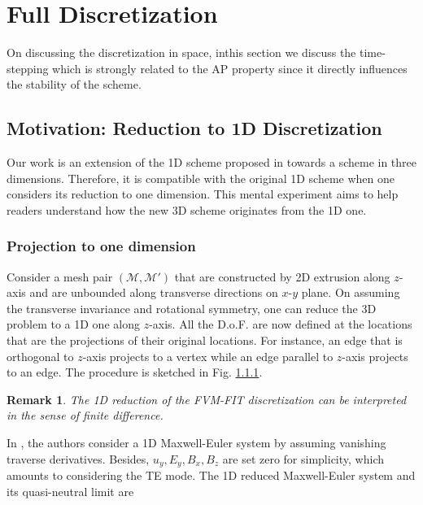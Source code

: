 \documentclass{article}
\newtheorem*{remark}{Remark}
\begin{document}
\section{Full Discretization}
On discussing the discretization in space, inthis section we discuss the time-stepping which is strongly related to the AP property since it directly influences the stability of the scheme. 
\subsection{Motivation: Reduction to 1D Discretization}
Our work is an extension of the 1D scheme proposed in \cite{degond_2012} towards a scheme in three dimensions. Therefore, it is compatible with the original 1D scheme when one considers its reduction to one dimension. This mental experiment aims to help readers understand how the new 3D scheme originates from the 1D one. 
\subsubsection{Projection to one dimension}
Consider a mesh pair $(\mathcal{M}, \mathcal{M}')$ that are constructed by 2D extrusion along $z$-axis and are unbounded along transverse directions on $x$-$y$ plane. On assuming the transverse invariance and rotational symmetry, one can reduce the 3D problem to a 1D one along $z$-axis. All the D.o.F. are now defined at the locations that are the projections of their original locations. For instance, an edge that is orthogonal to $z$-axis projects to a vertex while an edge parallel to $z$-axis projects to an edge. The procedure is sketched in Fig. \ref{}.

\begin{remark}
    The 1D reduction of the FVM-FIT discretization can be interpreted in the sense of finite difference. 
\end{remark}

In \cite{degond_2012}, the authors consider a 1D Maxwell-Euler system by assuming vanishing traverse derivatives. Besides, $u_y, E_y, B_x, B_z$ are set zero for simplicity, which amounts to considering the TE mode. The 1D reduced Maxwell-Euler system and its quasi-neutral limit are 
\end{document}
